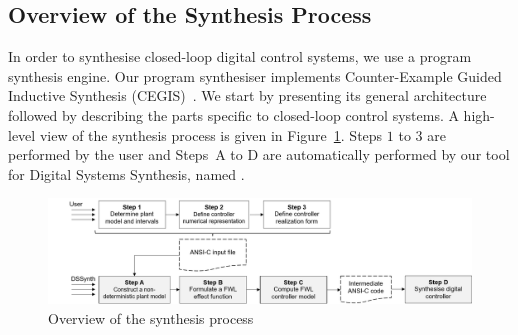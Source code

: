 \documentclass{sig-alternate-05-2015}
\begin{document}
\subsection{Overview of the Synthesis Process}
\label{verification-flow}

In order to synthesise closed-loop digital control systems, we use a program
synthesis engine.  Our program synthesiser implements Counter-Example Guided
Inductive Synthesis (CEGIS)~\cite{sketch}.  We start by presenting its
general architecture followed by describing the parts specific to
closed-loop control systems.  A high-level view of the synthesis process is
given in Figure~\ref{DSSynth_process}.  Steps $1$ to $3$ are performed by
the user and Steps~A to D are automatically performed by our tool for
Digital Systems Synthesis, named \tool.
%

\begin{figure}[t]
\centering
\includegraphics[width=\textwidth]{figures/verification-flow.png}
\vspace{1ex}
\caption{Overview of the synthesis process\label{DSSynth_process}}
\end{figure}

\end{document}
